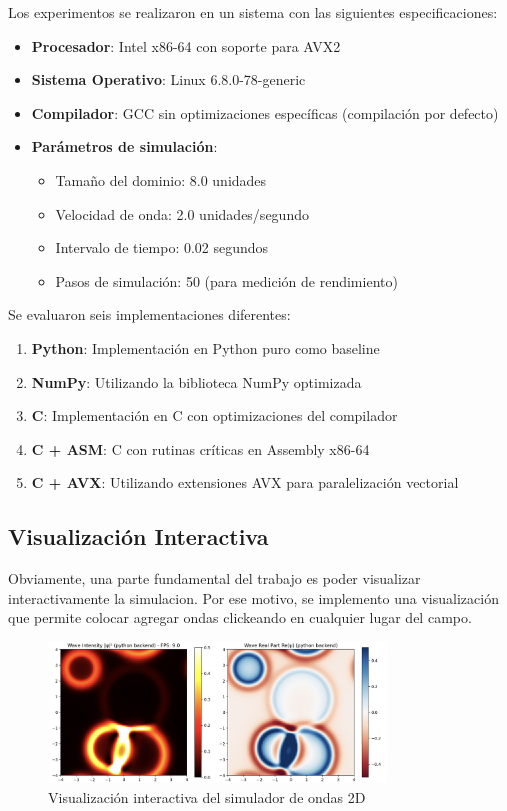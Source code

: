 \documentclass[a4paper]{article}
\begin{document}
Los experimentos se realizaron en un sistema con las siguientes especificaciones:
\begin{itemize}
    \item \textbf{Procesador}: Intel x86-64 con soporte para AVX2
    \item \textbf{Sistema Operativo}: Linux 6.8.0-78-generic
    \item \textbf{Compilador}: GCC sin optimizaciones específicas (compilación por defecto)
    \item \textbf{Parámetros de simulación}:
          \begin{itemize}
              \item Tamaño del dominio: 8.0 unidades
              \item Velocidad de onda: 2.0 unidades/segundo
              \item Intervalo de tiempo: 0.02 segundos
              \item Pasos de simulación: 50 (para medición de rendimiento)
          \end{itemize}
\end{itemize}

Se evaluaron seis implementaciones diferentes:
\begin{enumerate}
    \item \textbf{Python}: Implementación en Python puro como baseline
    \item \textbf{NumPy}: Utilizando la biblioteca NumPy optimizada
    \item \textbf{C}: Implementación en C con optimizaciones del compilador
    \item \textbf{C + ASM}: C con rutinas críticas en Assembly x86-64
    \item \textbf{C + AVX}: Utilizando extensiones AVX para paralelización vectorial
\end{enumerate}

\subsection{Visualización Interactiva}
Obviamente, una parte fundamental del trabajo es poder visualizar interactivamente la simulacion. Por ese motivo, se implemento una visualización que permite colocar
agregar ondas clickeando en cualquier lugar del campo.

\begin{figure}[h]
    \centering
    \includegraphics[width=0.8\textwidth]{extra/live_visualization.png}
    \caption{Visualización interactiva del simulador de ondas 2D}
    \label{fig:live_visualization}
\end{figure}
\end{document}
